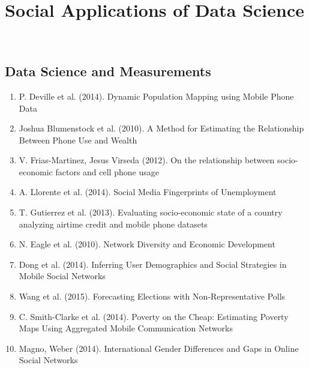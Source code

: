 \section{Social Applications of Data Science}
 
\\  
\subsection{Data Science and Measurements}  
\begin{enumerate}  
\item  P. Deville et al. (2014).  Dynamic Population Mapping using Mobile Phone Data\cite{Deville_2014} 
\item  Joshua Blumenstock et al. (2010).  A Method for Estimating the Relationship Between Phone Use and Wealth\cite{blumenstock2010method}  
\item  V. Frias-Martinez, Jesus Virseda (2012).  On the relationship between socio-economic factors and cell phone usage \cite{Frias_Martinez_2012} 
\item A. Llorente et al. (2014).  Social Media Fingerprints of Unemployment\cite{Llorente_2015}  
\item T. Gutierrez et al. (2013).  Evaluating socio-economic state of a country analyzing airtime credit and mobile phone datasets\cite{gutierrez2013evaluating}  
\item N. Eagle et al. (2010).  Network Diversity and Economic Development\cite{eagle2010network}   
\item Dong et al. (2014).  Inferring User Demographics and Social Strategies in Mobile Social Networks \cite{Dong:2014:IUD:2623330.2623703} 
\item Wang et al. (2015).  Forecasting Elections with Non-Representative Polls\cite{Wang2015980} 
\item C. Smith-Clarke et al. (2014).  Poverty on the Cheap: Estimating Poverty Maps Using Aggregated Mobile Communication Networks\cite{Smith-Clarke:2014:PCE:2556288.2557358} 
\item Magno, Weber (2014). International Gender Differences and Gaps in Online Social Networks \cite{Magno_2014}
\end{enumerate}  
\\
